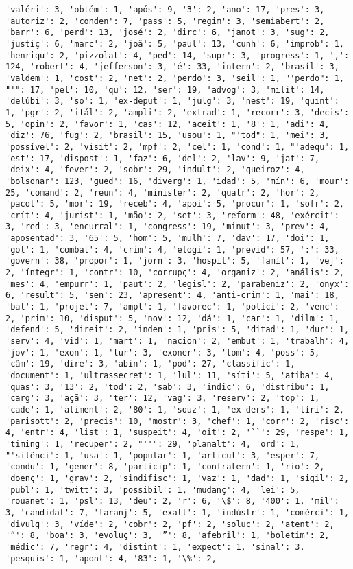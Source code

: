 \documentclass[11pt]{article}
\begin{document}
\begin{Verbatim}[commandchars=\\\{\}]
'valéri': 3, 'obtém': 1, 'após': 9, '3': 2, 'ano': 17, 'pres': 3, 'autoriz': 2, 'conden': 7, 'pass': 5, 'regim': 3, 'semiabert': 2, 'barr': 6, 'perd': 13, 'josé': 2, 'dirc': 6, 'janot': 3, 'sug': 2, 'justiç': 6, 'marc': 2, 'joã': 5, 'paul': 13, 'cunh': 6, 'improb': 1, 'henriqu': 2, 'pizzolat': 4, 'ped': 14, 'supr': 3, 'progress': 1, ',': 124, 'robert': 4, 'jefferson': 3, 'é': 33, 'intern': 2, 'brasíl': 3, 'valdem': 1, 'cost': 2, 'net': 2, 'perdo': 3, 'seil': 1, "'perdo": 1, "'": 17, 'pel': 10, 'qu': 12, 'ser': 19, 'advog': 3, 'milit': 14, 'delúbi': 3, 'so': 1, 'ex-deput': 1, 'julg': 3, 'nest': 19, 'quint': 1, 'pgr': 2, 'itál': 2, 'ampli': 2, 'extrad': 1, 'recorr': 3, 'decis': 5, 'opin': 2, 'favor': 1, 'cas': 12, 'aceit': 1, '8': 1, 'adi': 4, 'diz': 76, 'fug': 2, 'brasil': 15, 'usou': 1, "'tod": 1, 'mei': 3, 'possível': 2, 'visit': 2, 'mpf': 2, 'cel': 1, 'cond': 1, "'adequ": 1, 'est': 17, 'dispost': 1, 'faz': 6, 'del': 2, 'lav': 9, 'jat': 7, 'deix': 4, 'fever': 2, 'sobr': 29, 'indult': 2, 'queiroz': 4, 'bolsonar': 123, 'gued': 16, 'diverg': 1, 'idad': 5, 'mín': 6, 'mour': 25, 'comand': 2, 'reun': 4, 'minister': 2, 'quatr': 2, 'hor': 2, 'pacot': 5, 'mor': 19, 'receb': 4, 'apoi': 5, 'procur': 1, 'sofr': 2, 'crít': 4, 'jurist': 1, 'mão': 2, 'set': 3, 'reform': 48, 'exércit': 3, 'red': 3, 'encurral': 1, 'congress': 19, 'minut': 3, 'prev': 4, 'aposentad': 3, '65': 5, 'hom': 5, 'mulh': 7, 'dav': 17, 'doi': 1, 'gol': 1, 'combat': 4, 'crim': 4, 'elogi': 1, 'previd': 57, ':': 33, 'govern': 38, 'propor': 1, 'jorn': 3, 'hospit': 5, 'famíl': 1, 'vej': 2, 'íntegr': 1, 'contr': 10, 'corrupç': 4, 'organiz': 2, 'anális': 2, 'mes': 4, 'empurr': 1, 'paut': 2, 'legisl': 2, 'parabeniz': 2, 'onyx': 6, 'result': 5, 'sen': 23, 'apresent': 4, 'anti-crim': 1, 'mai': 18, 'bal': 1, 'projet': 7, 'ampl': 1, 'favorec': 1, 'políci': 2, 'venc': 2, 'prim': 10, 'disput': 5, 'nov': 12, 'dá': 1, 'car': 1, 'dilm': 1, 'defend': 5, 'direit': 2, 'inden': 1, 'pris': 5, 'ditad': 1, 'dur': 1, 'serv': 4, 'vid': 1, 'mart': 1, 'nacion': 2, 'embut': 1, 'trabalh': 4, 'jov': 1, 'exon': 1, 'tur': 3, 'exoner': 3, 'tom': 4, 'poss': 5, 'câm': 19, 'dire': 3, 'abin': 1, 'pod': 27, 'classific': 1, 'document': 1, 'ultrassecret': 1, 'lul': 11, 'síti': 5, 'atiba': 4, 'quas': 3, '13': 2, 'tod': 2, 'sab': 3, 'indic': 6, 'distribu': 1, 'carg': 3, 'açã': 3, 'ter': 12, 'vag': 3, 'reserv': 2, 'top': 1, 'cade': 1, 'aliment': 2, '80': 1, 'souz': 1, 'ex-ders': 1, 'líri': 2, 'parisott': 2, 'precis': 10, 'mostr': 3, 'chef': 1, 'corr': 2, 'risc': 4, 'entr': 4, 'list': 1, 'suspeit': 4, 'oit': 2, '``': 29, 'respe': 1, 'timing': 1, 'recuper': 2, "''": 29, 'planalt': 4, 'ord': 1, "'silênci": 1, 'usa': 1, 'popular': 1, 'articul': 3, 'esper': 7, 'condu': 1, 'gener': 8, 'particip': 1, 'confratern': 1, 'rio': 2, 'doenç': 1, 'grav': 2, 'sindifisc': 1, 'vaz': 1, 'dad': 1, 'sigil': 2, 'publ': 1, 'twitt': 3, 'possibil': 1, 'mudanç': 4, 'lei': 5, 'rouanet': 1, 'psl': 13, 'deu': 2, 'r': 6, '\$': 8, '400': 1, 'mil': 3, 'candidat': 7, 'laranj': 5, 'exalt': 1, 'indústr': 1, 'comérci': 1, 'divulg': 3, 'víde': 2, 'cobr': 2, 'pf': 2, 'soluç': 2, 'atent': 2, '“': 8, 'boa': 3, 'evoluç': 3, '”': 8, 'afebril': 1, 'boletim': 2, 'médic': 7, 'regr': 4, 'distint': 1, 'expect': 1, 'sinal': 3, 'pesquis': 1, 'apont': 4, '83': 1, '\%': 2, 
\end{Verbatim}
\end{document}

